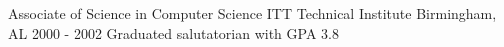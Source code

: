 
\begin{cventries}
  \cventry
    {Associate of Science in Computer Science} %
    {ITT Technical Institute} %
    {Birmingham, AL} %
    {2000 - 2002} %
    {Graduated salutatorian with GPA 3.8}

\end{cventries}
